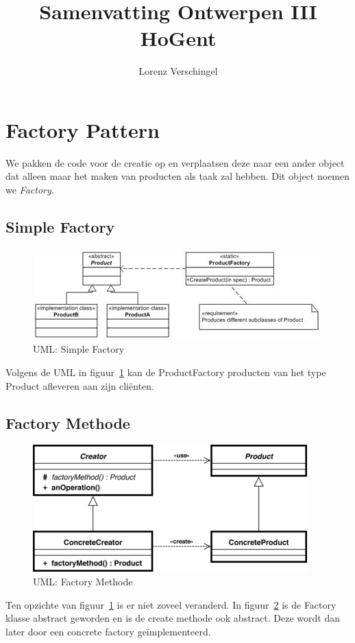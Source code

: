 \documentclass[a4paper,12pt]{article}
\title{Samenvatting Ontwerpen III \\ \large HoGent}
\author{Lorenz Verschingel}
\begin{document}
\maketitle
\section{Factory Pattern}
We pakken de code voor de creatie op en verplaatsen deze naar een ander object dat alleen maar het maken van producten als taak zal hebben.
Dit object noemen we \textit{Factory}.

\subsection{Simple Factory}
\begin{figure}[H]
\centering
  	\includegraphics[width=.5\linewidth]{img/Factory/SimpleFactory.jpg}
  	\caption{UML: Simple Factory}
  	\label{fig:SimpleFactory}
\end{figure}

Volgens de UML in figuur~\ref{fig:SimpleFactory} kan de ProductFactory producten van het type Product afleveren aan zijn cliënten.

\subsection{Factory Methode}
\begin{figure}[H]
\centering
  	\includegraphics[width=.5\linewidth]{img/Factory/FactoryMethod.png}
  	\caption{UML: Factory Methode}
  	\label{fig:FactoryMethod}
\end{figure}

Ten opzichte van figuur~\ref{fig:SimpleFactory} is er niet zoveel veranderd.
In figuur~\ref{fig:FactoryMethod} is de Factory klasse abstract geworden en is de create methode ook abstract.
Deze wordt dan later door een concrete factory geïmplementeerd.
\end{document}
